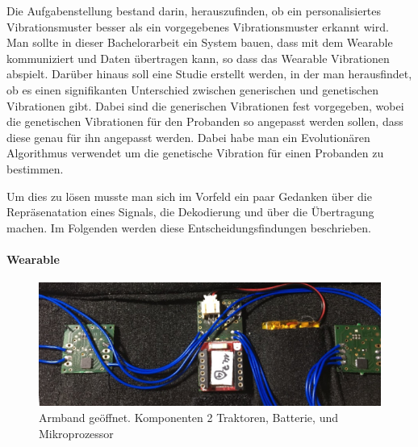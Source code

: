 
Die Aufgabenstellung bestand darin, herauszufinden, ob ein personalisiertes Vibrationsmuster besser als ein vorgegebenes Vibrationsmuster erkannt wird.
Man sollte in dieser Bachelorarbeit ein System bauen, dass mit dem Wearable kommuniziert und Daten {\"u}bertragen kann, so dass das Wearable Vibrationen abspielt. Dar{\"u}ber hinaus soll eine Studie erstellt werden, in der man herausfindet, ob es einen signifikanten Unterschied zwischen generischen und genetischen Vibrationen gibt. Dabei sind die generischen Vibrationen fest vorgegeben, wobei die genetischen Vibrationen f{\"u}r den Probanden so angepasst werden sollen, dass diese genau f{\"u}r ihn angepasst werden. Dabei habe man ein Evolution{\"a}ren Algorithmus verwendet um die genetische Vibration f{\"u}r einen Probanden zu bestimmen. 

Um dies zu l{\"o}sen musste man sich im Vorfeld ein paar Gedanken {\"u}ber die Repr{\"a}senatation eines Signals, die Dekodierung und {\"u}ber die {\"U}bertragung machen.
Im Folgenden werden diese Entscheidungsfindungen beschrieben.

\paragraph{Wearable}

\begin{figure}
	\centering
    \includegraphics[width=\textwidth]{pics/wristband11.png}
    \caption{Armband ge{\"o}ffnet. Komponenten 2 Traktoren, Batterie, und Mikroprozessor}
    \label{fig:wristband1}
\end{figure}

